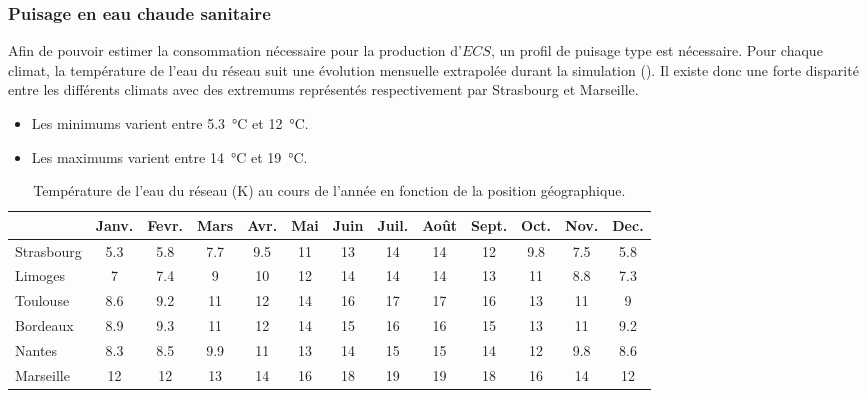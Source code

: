 \subsubsection{Puisage en eau chaude sanitaire} %
\label{ssub:puisage_en_eau_chaude_sanitaire}
Afin de pouvoir estimer la consommation nécessaire pour la production d’$ECS$, un profil
de puisage type est nécessaire. Pour chaque climat, la température de l’eau du réseau suit
une évolution mensuelle extrapolée durant la simulation
(). Il existe donc une forte disparité entre les différents climats
avec des extremums représentés respectivement par Strasbourg et Marseille.
\begin{itemize}
    \item Les minimums varient entre \SI{5.3}{\celsius} et \SI{12}{\celsius}.
    \item Les maximums varient entre \SI{14}{\celsius} et \SI{19}{\celsius}.
\end{itemize}

\begin{table}
\centering
\caption{Température de l'eau du réseau (\si{\kelvin}) au cours de l'année en fonction de la
         position géographique.}
\label{tab:temp_eau}
\begin{tabular}{l*{12}{c}}
    \toprule
               & Janv. & Fevr. & Mars & Avr. & Mai & Juin & Juil. & Août & Sept. & Oct. & Nov. & Dec. \\
    \midrule
    Strasbourg & \num{5.3}   & \num{5.8}   & \num{7.7}  & \num{9.5}  & \num{11}  & \num{13}   & \num{14}    & \num{14}   & \num{12}    & \num{9.8}  & \num{7.5}  & \num{5.8}  \\
    Limoges    & \num{7}     & \num{7.4}   & \num{9}    & \num{10}   & \num{12}  & \num{14}   & \num{14}    & \num{14}   & \num{13}    & \num{11}   & \num{8.8}  & \num{7.3}  \\
    Toulouse   & \num{8.6}   & \num{9.2}   & \num{11}   & \num{12}   & \num{14}  & \num{16}   & \num{17}    & \num{17}   & \num{16}    & \num{13}   & \num{11}   & \num{9}    \\
    Bordeaux   & \num{8.9}   & \num{9.3}   & \num{11}   & \num{12}   & \num{14}  & \num{15}   & \num{16}    & \num{16}   & \num{15}    & \num{13}   & \num{11}   & \num{9.2}  \\
    Nantes     & \num{8.3}   & \num{8.5}   & \num{9.9}  & \num{11}   & \num{13}  & \num{14}   & \num{15}    & \num{15}   & \num{14}    & \num{12}   & \num{9.8}  & \num{8.6}  \\
    Marseille  & \num{12}    & \num{12}    & \num{13}   & \num{14}   & \num{16}  & \num{18}   & \num{19}    & \num{19}   & \num{18}    & \num{16}   & \num{14}   & \num{12}   \\
    \bottomrule
\end{tabular}
\end{table}


